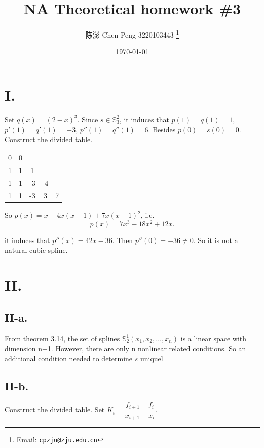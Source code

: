 \documentclass[a4paper]{article}
\begin{document}
\title{NA Theoretical homework \#3}

\author{陈澎 Chen Peng 3220103443
  \thanks{Email: \texttt{cpzju@zju.edu.cn}}}


\date{\today}

\maketitle

\section*{I.}
Set $q(x)=(2-x)^3$. Since $s\in \mathbb{S}_3^2$, it induces that $p(1)=q(1)=1$, $p'(1)=q'(1)=-3$, $p''(1)=q''(1)=6$. Besides $p(0)=s(0)=0$.
Construct the divided table.

\begin{table}[!htbp]
  \centering
  \begin{tabular}{c|cccc}
    0 & 0 & & & \\
    1 & 1 & 1 & &  \\
    1 & 1 &-3 & -4 & \\
    1 & 1 &-3 & 3 & 7 \\
  \end{tabular}
\end{table}

So $p(x)=x-4x(x-1)+7x(x-1)^2$, i.e.
$$p(x)=7x^3-18x^2+12x.$$

it induces that $p''(x)=42x-36$. Then $p''(0)=-36\neq0$. So it is not a natural cubic spline.

\section*{II.}
\subsection*{II-a.}
From theorem 3.14, the set of splines $\mathbb{S}_2^1(x_1,x_2,\ldots,x_n)$ is a linear space with dimension n+1. 
However, there are only n nonlinear related conditions. So an additional condition needed to determine $s$ uniquel

\subsection*{II-b.}
Construct the divided table. Set $K_i=\dfrac{f_{i+1}-f_i}{x_{i+1}-x_i}$.
\end{document}
